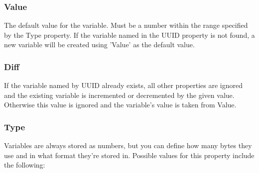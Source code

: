 \documentclass[12pt,a4paper,notitlepage]{article}
\begin{document}
\subsubsection{Value}
The default value for the variable. Must be a number within the range specified by the Type property. If the variable named in the UUID property is not found, a new variable will be created using 'Value' as the default value.

\subsubsection{Diff}
If the variable named by UUID already exists, all other properties are ignored and the existing variable is incremented or decremented by the given value. Otherwise this value is ignored and the variable's value is taken from Value.

\subsubsection{Type}
\label{subsubsec:create-var-type}
Variables are always stored as numbers, but you can define how many bytes they use and in what format they're stored in. Possible values for this property include the following:
\end{document}
